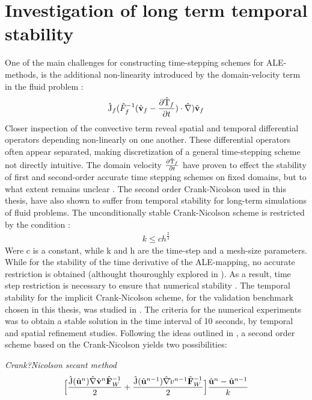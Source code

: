 \section{Investigation of long term temporal stability}
One of the main challenges for constructing time-stepping schemes for ALE-methods, is the additional non-linearity introduced by the domain-velocity term in the fluid problem \cite{Formaggia2004}:
\begin{align}
\text{\^{J}}_f (\hat{F}_f^{-1}(\hat{\mathbf{v}}_f - \frac{\partial \text{\^{T}}_f}{\partial t}) \cdot \hat{\nabla}) \hat{\mathbf{v}}_f
\end{align} 
Closer inspection of the convective term reveal spatial and temporal differential operators depending non-linearly on one another. These differential operators often appear separated, making discretization of a general time-stepping scheme not directly intuitive. The domain velocity $ \frac{\partial \text{\^{T}}_f}{\partial t}$ have proven to effect the stability of first and second-order accurate time stepping schemes on fixed domains, but to what extent remains unclear  \cite{Formaggia2004, Formaggia1991}. The second order Crank-Nicolson used in this thesis, have also shown to suffer from temporal stability for long-term simulations of fluid problems. The unconditionally stable Crank-Nicolson scheme is restricted by the condition \cite{Wick2013a}:
\begin{align}
k \leq ch^{\frac{2}{3}} 
\end{align}
Were c is a constant, while k and h are the time-step and a mesh-size parameters. While for the stability of the time derivative of the ALE-mapping, no accurate restriction is obtained (althought thouroughly explored in \cite{Formaggia2004}). As a result, time step restriction is necessary to ensure that numerical stability  \cite{Formaggia2004}. The temporal stability for the implicit Crank-Nicolson scheme, for the validation benchmark chosen in this thesis, was studied in  \cite{Richter2015}. The criteria for the numerical experiments was to obtain a stable solution in the time interval of 10 seconds, by temporal and spatial refinement studies. Following the ideas outlined in \cite{Richter2015}, a second order scheme based on the Crank-Nicolson yields two possibilities:
\begin{discr}
\textit{Crank?Nicolson secant method }
\begin{align*}
\Big[\frac{\text{\^{J}}(\hat{\mathbf{u}}^{n}) \hat{\mathbf{\nabla}} \hat{\mathbf{v}}^{n} \hat{\mathbf{F}}_W^{-1}}{2} 
+ \frac{\text{\^{J}}(\hat{\mathbf{u}}^{n-1}) \hat{\mathbf{\nabla}} \hat{\mathbf{}}v^{n-1} \hat{\mathbf{F}}_W^{-1}}{2} \Big] 
\frac{\hat{\mathbf{u}}^{n} - \hat{\mathbf{u}}^{n-1}}{k}
\end{align*} 
\label{eq:cn1}
\end{discr}

